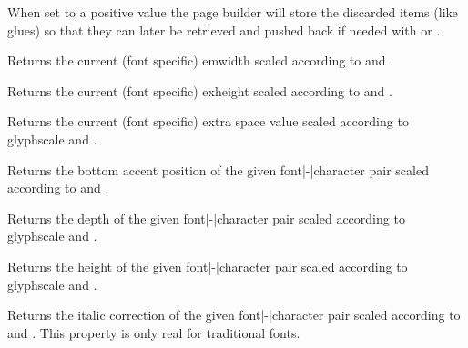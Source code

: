 When set to a positive value the page builder will store the discarded items
(like glues) so that they can later be retrieved and pushed back if needed with
 or .

\stopoldprimitive

\startnewprimitive[title={\prm {scaledemwidth}}]

Returns the current (font specific) emwidth scaled according to 
and .

\stopnewprimitive

\startnewprimitive[title={\prm {scaledexheight}}]

Returns the current (font specific) exheight scaled according to 
and .

\stopnewprimitive

\startnewprimitive[title={\prm {scaledextraspace}}]

Returns the current (font specific) extra space value scaled according to \prm
{glyphscale} and .

\stopnewprimitive

\startnewprimitive[title={\prm {scaledfontcharba}}]

Returns the bottom accent position of the given font|-|character pair scaled
according to  and .

\stopnewprimitive

\startnewprimitive[title={\prm {scaledfontchardp}}]

Returns the depth of the given font|-|character pair scaled according to \prm
{glyphscale} and .

\stopnewprimitive

\startnewprimitive[title={\prm {scaledfontcharht}}]

Returns the height of the given font|-|character pair scaled according to \prm
{glyphscale} and .

\stopnewprimitive

\startnewprimitive[title={\prm {scaledfontcharic}}]

Returns the italic correction of the given font|-|character pair scaled according
to  and . This property is only real for
traditional fonts.

\stopnewprimitive

\startnewprimitive[title={\prm {scaledfontcharlb}}]

